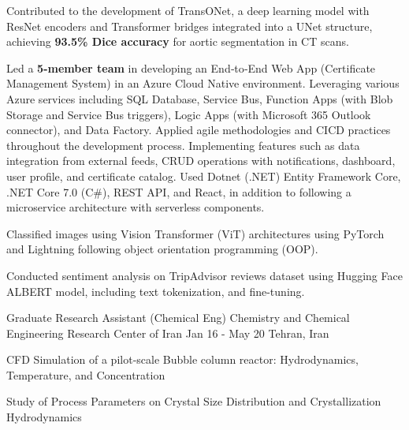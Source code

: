 \begin{cventries}
{\begin{cvitemsfree}
                \item{Contributed to the development of TransONet, a deep learning model with ResNet encoders and Transformer bridges integrated into a UNet structure, achieving \textbf{93.5\% Dice accuracy} for aortic segmentation in CT scans.}
                \item{Led a \textbf{5-member team} in developing an End‑to‑End Web App (Certificate Management System) in an Azure Cloud Native environment. Leveraging various Azure services including SQL Database, Service Bus, Function Apps (with Blob Storage and Service Bus triggers), Logic Apps (with Microsoft 365 Outlook connector), and Data Factory. Applied agile methodologies and CI\/CD practices throughout the development process. Implementing features such as data integration from external feeds, CRUD operations with notifications, dashboard, user profile, and certificate catalog. Used Dotnet (.NET) Entity Framework Core, .NET Core 7.0 (C\#), REST API, and React, in addition to following a microservice architecture with serverless components.}
                \item{Classified images using Vision Transformer (ViT) architectures using PyTorch and Lightning following object orientation programming (OOP).}
                \item{Conducted sentiment analysis on TripAdvisor reviews dataset using Hugging Face ALBERT model, including text tokenization, and fine-tuning.}
            \end{cvitemsfree}
        }
    \cventry
        {Graduate Research Assistant (Chemical Eng)} %
        {Chemistry and Chemical Engineering Research Center of Iran} %
        {Jan 16 - May 20} %
        {Tehran, Iran} %
        {
            \begin{cvitemsfree} %
                \item{CFD Simulation of a pilot-scale Bubble column reactor: Hydrodynamics, Temperature, and Concentration}
                \item{Study of Process Parameters on Crystal Size Distribution and Crystallization Hydrodynamics}

\end{cvitemsfree}}
\end{cventries}
